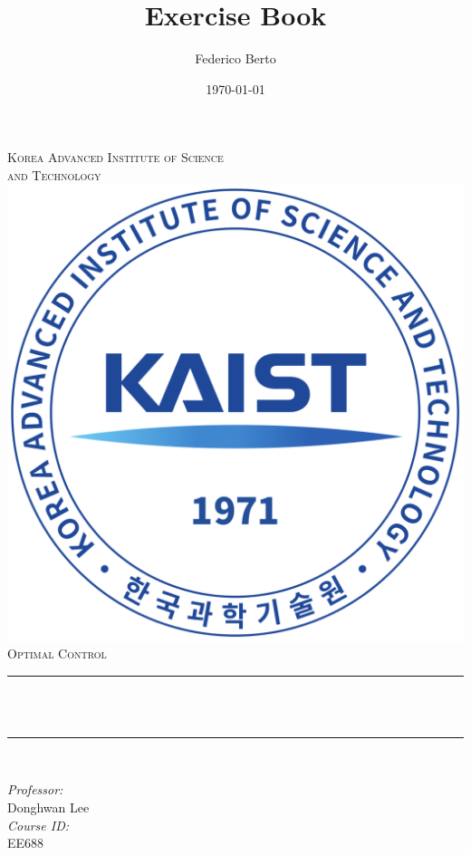 \documentclass[12pt]{article}
\title{Exercise Book}
\author{Federico Berto}
\date{\today}
\makeatletter
\newcommand{\professor}{Donghwan Lee}
\newcommand{\coursename}{Optimal Control}
\newcommand{\courseid}{EE688}
\let\thetitle\@title
\makeatother
\begin{document}

\begin{titlepage}
	\centering
    \textsc{\LARGE  Korea Advanced Institute of Science \\ \smallskip and Technology}\\[1 cm]	%
    \includegraphics[scale = 0.18]{kaist_round_logo.png}\\[1.5 cm]	%

	\textsc{\Large \coursename}\\[0.5 cm]				%
	\rule{\linewidth}{0.2 mm} \\[0.4 cm]
	{ \huge \bfseries {\thetitle}}\\
	\rule{\linewidth}{0.2 mm} \\[1.5 cm]
	

	\begin{minipage}{0.5\textwidth}
		\begin{flushleft} \large
			\emph{Professor:}\\
		    \professor \\ [0.5cm]
            \emph{Course ID:}\\
            \courseid
			\end{flushleft}
			\end{minipage}~
			\begin{minipage}{0.4\textwidth}
            

\end{minipage}
\end{titlepage}
\end{document}
